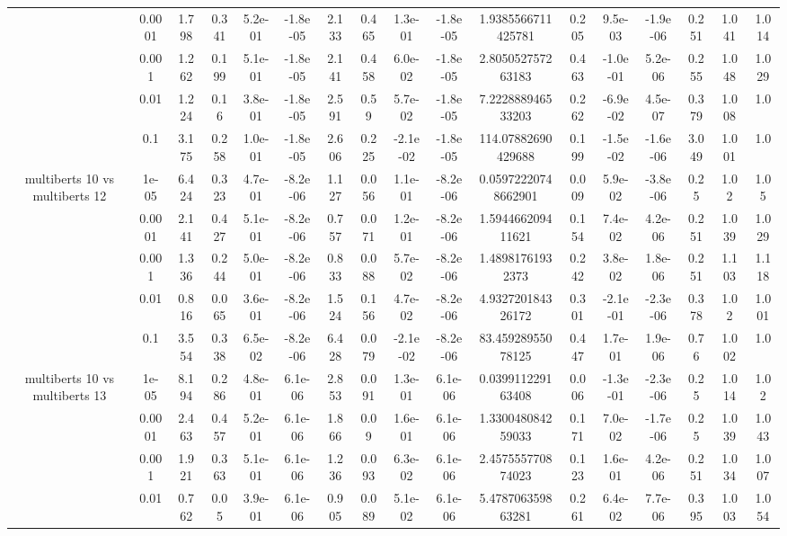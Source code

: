 \begin{tabular}{|c|c|c|c|c|c|c|c|c|c|c|c|c|c|c|c|c|}
 & 0.0001 & 1.798 & 0.341 & 5.2e-01 & -1.8e-05 & 2.133 & 0.465 & 1.3e-01 & -1.8e-05 & 1.9385566711425781 & 0.205 & 9.5e-03 & -1.9e-06 & 0.251 & 1.041 & 1.014 \\
 & 0.001 & 1.262 & 0.199 & 5.1e-01 & -1.8e-05 & 2.141 & 0.458 & 6.0e-02 & -1.8e-05 & 2.805052757263183 & 0.463 & -1.0e-01 & 5.2e-06 & 0.255 & 1.048 & 1.029 \\
 & 0.01 & 1.224 & 0.16 & 3.8e-01 & -1.8e-05 & 2.591 & 0.59 & 5.7e-02 & -1.8e-05 & 7.222888946533203 & 0.262 & -6.9e-02 & 4.5e-07 & 0.379 & 1.008 & 1.0 \\
 & 0.1 & 3.175 & 0.258 & 1.0e-01 & -1.8e-05 & 2.606 & 0.225 & -2.1e-02 & -1.8e-05 & 114.07882690429688 & 0.199 & -1.5e-02 & -1.6e-06 & 3.049 & 1.001 & 1.0 \\
\hline
\multirow{5}{*}{multiberts 10 vs multiberts 12} & 1e-05 & 6.424 & 0.323 & 4.7e-01 & -8.2e-06 & 1.127 & 0.056 & 1.1e-01 & -8.2e-06 & 0.05972220748662901 & 0.009 & 5.9e-02 & -3.8e-06 & 0.25 & 1.02 & 1.05 \\
 & 0.0001 & 2.141 & 0.427 & 5.1e-01 & -8.2e-06 & 0.757 & 0.071 & 1.2e-01 & -8.2e-06 & 1.594466209411621 & 0.154 & 7.4e-02 & 4.2e-06 & 0.251 & 1.039 & 1.029 \\
 & 0.001 & 1.336 & 0.244 & 5.0e-01 & -8.2e-06 & 0.833 & 0.088 & 5.7e-02 & -8.2e-06 & 1.48981761932373 & 0.242 & 3.8e-02 & 1.8e-06 & 0.251 & 1.103 & 1.118 \\
 & 0.01 & 0.816 & 0.065 & 3.6e-01 & -8.2e-06 & 1.524 & 0.156 & 4.7e-02 & -8.2e-06 & 4.932720184326172 & 0.301 & -2.1e-01 & -2.3e-06 & 0.378 & 1.02 & 1.001 \\
 & 0.1 & 3.554 & 0.338 & 6.5e-02 & -8.2e-06 & 6.428 & 0.079 & -2.1e-02 & -8.2e-06 & 83.45928955078125 & 0.447 & 1.7e-01 & 1.9e-06 & 0.76 & 1.002 & 1.0 \\
\hline
\multirow{5}{*}{multiberts 10 vs multiberts 13} & 1e-05 & 8.194 & 0.286 & 4.8e-01 & 6.1e-06 & 2.853 & 0.091 & 1.3e-01 & 6.1e-06 & 0.039911229163408 & 0.006 & -1.3e-01 & -2.3e-06 & 0.25 & 1.014 & 1.02 \\
 & 0.0001 & 2.463 & 0.457 & 5.2e-01 & 6.1e-06 & 1.866 & 0.09 & 1.6e-01 & 6.1e-06 & 1.330048084259033 & 0.171 & 7.0e-02 & -1.7e-06 & 0.25 & 1.039 & 1.043 \\
 & 0.001 & 1.921 & 0.363 & 5.1e-01 & 6.1e-06 & 1.236 & 0.093 & 6.3e-02 & 6.1e-06 & 2.457555770874023 & 0.123 & 1.6e-01 & 4.2e-06 & 0.251 & 1.034 & 1.007 \\
 & 0.01 & 0.762 & 0.05 & 3.9e-01 & 6.1e-06 & 0.905 & 0.089 & 5.1e-02 & 6.1e-06 & 5.478706359863281 & 0.261 & 6.4e-02 & 7.7e-06 & 0.395 & 1.003 & 1.054 \\

\end{tabular}
